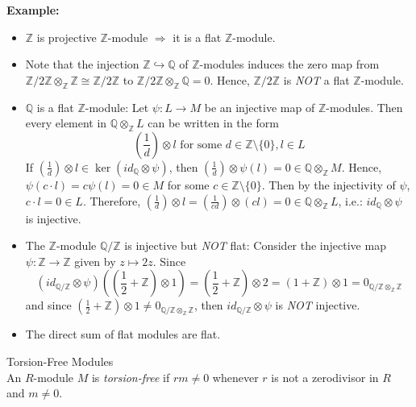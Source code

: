 \noindent\textbf{Example:} \begin{itemize}
    \item $\mathbb{Z}$ is projective $\mathbb{Z}$-module $\Rightarrow$ it is a flat $\mathbb{Z}$-module.
    \item Note that the injection $\mathbb{Z} \hookrightarrow \mathbb{Q}$ of $\mathbb{Z}$-modules induces the zero map from $\mathbb{Z}/ 2\mathbb{Z} \otimes_\mathbb{Z} \mathbb{Z} \cong \mathbb{Z}/ 2\mathbb{Z}$ to $\mathbb{Z}/ 2\mathbb{Z} \otimes_\mathbb{Z} \mathbb{Q} =0$. Hence, $\mathbb{Z}/ 2\mathbb{Z}$ is \textit{NOT} a flat $\mathbb{Z}$-module.

    \item $\mathbb{Q}$ is a flat $\mathbb{Z}$-module: Let $\psi: L\to M$ be an injective map of $\mathbb{Z}$-modules. Then every element in $\mathbb{Q} \otimes_\mathbb{Z} L$ can be written in the form
    \[
    (\frac{1}{d}) \otimes l \text{ for some } d\in \mathbb{Z} \setminus \{0\}, l\in L
    \]
    If $(\frac{1}{d}) \otimes l \in \ker(id_\mathbb{Q} \otimes \psi)$, then $(\frac{1}{d}) \otimes \psi(l) =0 \in \mathbb{Q} \otimes_\mathbb{Z} M$. Hence, $\psi (c\cdot l) =c \psi (l) =0\in M$ for some $c\in \mathbb{Z} \setminus \{0\}$. Then by the injectivity of $\psi$, $c\cdot l=0 \in L$. Therefore, $(\frac{1}{d}) \otimes l = (\frac{1}{cd}) \otimes (cl) =0 \in \mathbb{Q} \otimes_\mathbb{Z} L$, i.e.: $id_\mathbb{Q} \otimes \psi$ is injective.

    \item The $\mathbb{Z}$-module $\mathbb{Q}/ \mathbb{Z}$ is injective but \textit{NOT} flat: Consider the injective map $\psi: \mathbb{Z} \to \mathbb{Z}$ given by $z \mapsto 2z$. Since
    $$(id_{\mathbb{Q} /\mathbb{Z}} \otimes \psi) ((\frac{1}{2} +\mathbb{Z}) \otimes 1) = (\frac{1}{2} +\mathbb{Z}) \otimes 2 =(1+\mathbb{Z} ) \otimes 1 =0_{\mathbb{Q}/ \mathbb{Z} \otimes_\mathbb{Z} \mathbb{Z}}$$
    and since $(\frac{1}{2} +\mathbb{Z}) \otimes 1 \neq 0 _{\mathbb{Q}/ \mathbb{Z} \otimes_\mathbb{Z} \mathbb{Z}}$, then $id_{\mathbb{Q}/ \mathbb{Z}} \otimes\psi$ is \textit{NOT} injective.

    \item The direct sum of flat modules are flat.
\end{itemize}

\begin{definition}{Torsion-Free Modules}\\
An $R$-module $M$ is \textit{torsion-free} if $rm\neq0$ whenever $r$ is not a zerodivisor in $R$ and $m\neq0$.
\end{definition}

